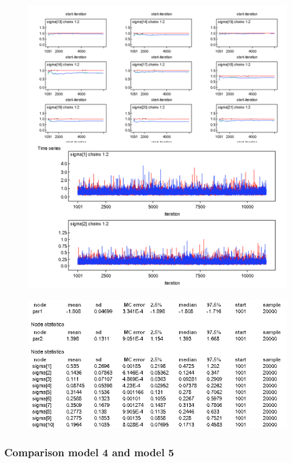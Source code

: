 \documentclass{article}
\begin{document}
\begin{figure}[ht!]
\centering
\includegraphics[width=14cm]{figures/model5_sigma2.png}
\end{figure}

\begin{figure}[ht!]
\centering
\includegraphics[width=12cm]{figures/model5_ultima.png}
\end{figure}

\newpage

\subsubsection*{Comparison model 4 and model 5}
\end{document}
